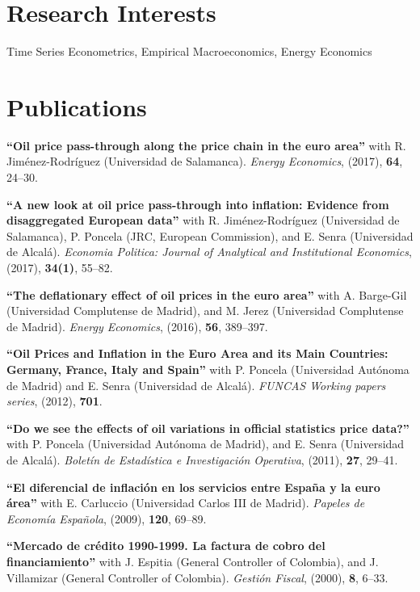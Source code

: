 \documentclass[11pt]{article}\usepackage[]{graphicx}\usepackage[]{color}
\begin{document}
\clearpage
\section{Research Interests}

Time Series Econometrics, Empirical Macroeconomics, Energy Economics
\vspace{10pt}

\section{Publications}

 \textbf{``Oil price pass-through along the price chain in the euro area''} with R. Jiménez-Rodríguez (Universidad de Salamanca). \emph{Energy Economics}, (2017), \textbf{64}, 24--30.

 \textbf{``A new look at oil price pass-through into inflation: Evidence from disaggregated European data''} with R. Jiménez-Rodríguez (Universidad de Salamanca), P. Poncela (JRC, European Commission), and E. Senra (Universidad de Alcalá). \emph{Economia Politica: Journal of Analytical and Institutional Economics}, (2017), \textbf{34(1)}, 55--82.

 \textbf{``The deflationary effect of oil prices in the euro area''} with A. Barge-Gil (Universidad Complutense de Madrid), and M. Jerez (Universidad Complutense de Madrid). \emph{Energy Economics}, (2016), \textbf{56}, 389--397.

 \textbf{``Oil Prices and Inflation in the Euro Area and its Main Countries: Germany, France, Italy and Spain''} with P. Poncela (Universidad Autónoma de Madrid) and E. Senra (Universidad de Alcalá). \emph{FUNCAS Working papers series}, (2012), \textbf{701}.

 \textbf{``Do we see the effects of oil variations in official statistics price data?''} with P. Poncela (Universidad Autónoma de Madrid), and E. Senra (Universidad de Alcalá). \emph{Boletín de Estadística e Investigación Operativa}, (2011), \textbf{27}, 29--41.

 \textbf{``El diferencial de inflación en los servicios entre España y la euro área''} with E. Carluccio (Universidad Carlos III de Madrid). \emph{Papeles de Economía Española}, (2009), \textbf{120}, 69--89.

 \textbf{``Mercado de crédito 1990-1999. La factura de cobro del financiamiento''} with J. Espitia (General Controller of Colombia), and J. Villamizar (General Controller of Colombia). \emph{Gestión Fiscal}, (2000), \textbf{8}, 6--33.
\end{document}
